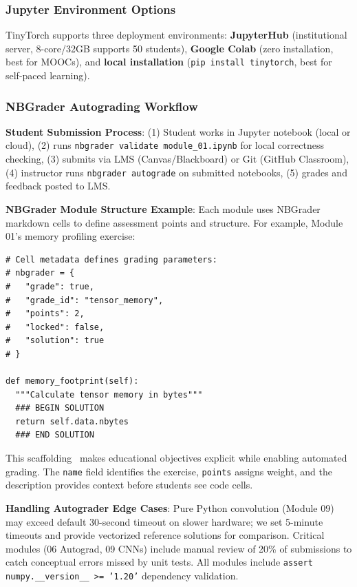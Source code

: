 \documentclass[10pt,twocolumn]{article}
\begin{document}
\subsubsection{Jupyter Environment Options}

TinyTorch supports three deployment environments: \textbf{JupyterHub} (institutional server, 8-core/32GB supports 50 students), \textbf{Google Colab} (zero installation, best for MOOCs), and \textbf{local installation} (\texttt{pip install tinytorch}, best for self-paced learning).

\subsubsection{NBGrader Autograding Workflow}

\textbf{Student Submission Process}: (1) Student works in Jupyter notebook (local or cloud), (2) runs \texttt{nbgrader validate module\_01.ipynb} for local correctness checking, (3) submits via LMS (Canvas/Blackboard) or Git (GitHub Classroom), (4) instructor runs \texttt{nbgrader autograde} on submitted notebooks, (5) grades and feedback posted to LMS.

\textbf{NBGrader Module Structure Example}: Each module uses NBGrader markdown cells to define assessment points and structure. For example, Module 01's memory profiling exercise:

\begin{lstlisting}[caption={\textbf{NBGrader Structure.} Cell metadata defines point allocation and solution delimiters.},label={lst:nbgrader-example},float=t]
# Cell metadata defines grading parameters:
# nbgrader = {
#   "grade": true,
#   "grade_id": "tensor_memory",
#   "points": 2,
#   "locked": false,
#   "solution": true
# }

def memory_footprint(self):
  """Calculate tensor memory in bytes"""
  ### BEGIN SOLUTION
  return self.data.nbytes
  ### END SOLUTION
\end{lstlisting}

This scaffolding~\citep{vygotsky1980} makes educational objectives explicit while enabling automated grading. The \texttt{name} field identifies the exercise, \texttt{points} assigns weight, and the description provides context before students see code cells.

\textbf{Handling Autograder Edge Cases}: Pure Python convolution (Module 09) may exceed default 30-second timeout on slower hardware; we set 5-minute timeouts and provide vectorized reference solutions for comparison. Critical modules (06 Autograd, 09 CNNs) include manual review of 20\% of submissions to catch conceptual errors missed by unit tests. All modules include \texttt{assert numpy.\_\_version\_\_ >= '1.20'} dependency validation.
\end{document}
